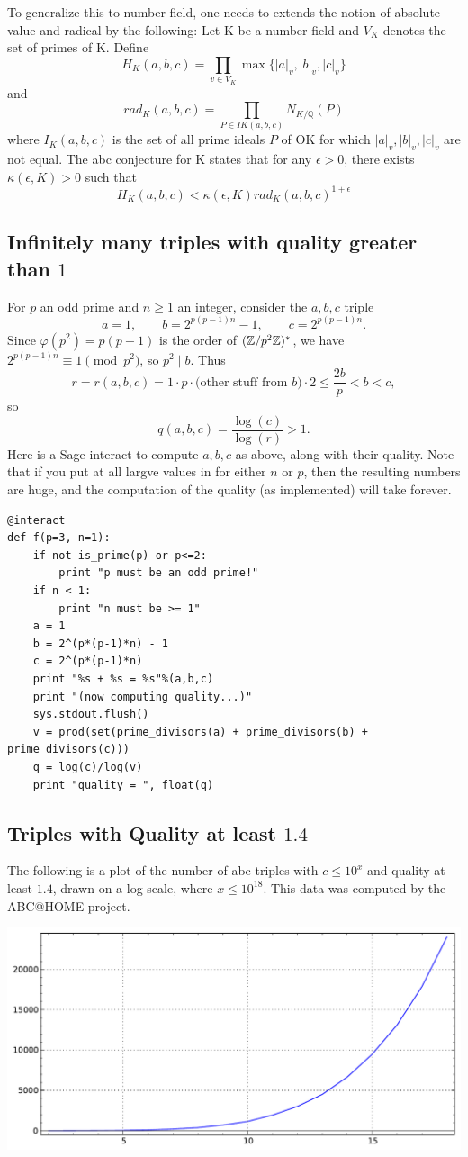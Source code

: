 \documentclass{book}
\begin{document}

To generalize this to number field, one needs to extends
the notion of absolute value and radical by the following:
Let K be a number field and $V_K$ denotes the set of primes
of K. Define
\[
    H_K(a,b,c) = \prod_{v \in V_K} \max\{|a|_v,|b|_v,|c|_v\}
\]
and
\[
    rad_K(a,b,c) = \prod_{P \in IK(a,b,c)}N_{K/\mathbb{Q}}(P)
\]
where $I_K(a,b,c)$ is the set of all prime ideals $P$ of OK for which $|a|_v,|b|_v,|c|_v$ are not equal. The abc conjecture for K states that for any $\epsilon >0$,
there exists $\kappa(\epsilon, K)>0$
such that
\[
H_K(a,b,c) < \kappa(\epsilon, K) rad_K(a,b,c)^{1+\epsilon}
\]

\subsection{Infinitely many triples with quality greater than $1$}
For $p$ an odd prime and $n\geq 1$ an integer, consider the $a,b,c$ triple
$$
a = 1,\qquad b = 2^{p(p-1)n}-1, \qquad c = 2^{p(p-1)n}.
$$
Since $\varphi(p^2)=p(p-1)$ is the order of $(\mathbb{Z}/p^2\mathbb{Z})^*$,
we have $2^{p(p-1)n}\equiv 1 \pmod{p^2}$,
so $p^2 \mid b$.
Thus
$$
 r = r(a,b,c) = 1 \cdot p \cdot\text{(other stuff from $b$)} \cdot 2
     \leq \frac{2b}{p} < b < c,
$$
so
$$
 q(a,b,c) = \frac{\log(c)}{\log(r)} > 1.
$$
Here is a Sage interact to compute $a,b,c$ as above, along with their quality.
Note that if you put at all largve values in for either $n$ or $p$,
then the resulting numbers are huge, and the computation of the quality
(as implemented) will take forever.
\begin{lstlisting}
@interact
def f(p=3, n=1):
    if not is_prime(p) or p<=2:
        print "p must be an odd prime!"
    if n < 1:
        print "n must be >= 1"
    a = 1
    b = 2^(p*(p-1)*n) - 1
    c = 2^(p*(p-1)*n)
    print "%s + %s = %s"%(a,b,c)
    print "(now computing quality...)"
    sys.stdout.flush()
    v = prod(set(prime_divisors(a) + prime_divisors(b) + prime_divisors(c)))
    q = log(c)/log(v)
    print "quality = ", float(q)
\end{lstlisting}

\subsection{Triples with Quality at least $1.4$}\label{sec:abchome}
The following is a plot of the number of abc triples with $c\leq 10^x$
and quality at least $1.4$, drawn on a log scale,
where $x\leq 10^{18}$.  This data was computed by the ABC@HOME project.
\begin{center}
\includegraphics[width=.7\textwidth]{pics/abcplot.pdf}
\end{center}
\end{document}

